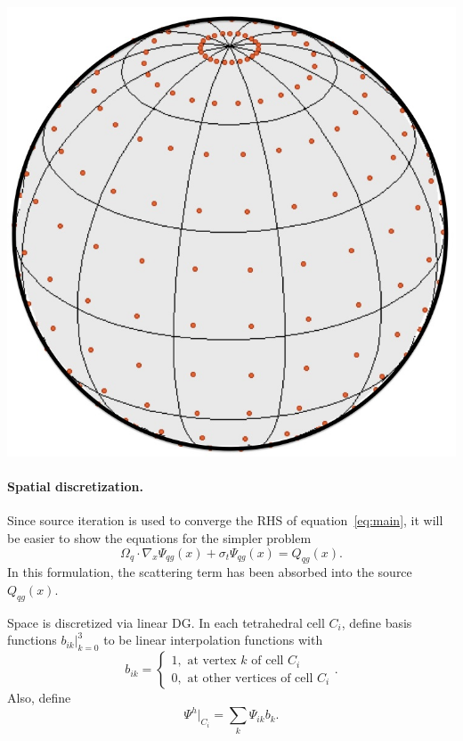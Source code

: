 \documentclass[12pt,letterpaper]{article}
\begin{document}
\includegraphics[scale=0.5]{chebyshev-legendre.jpg}


\paragraph{Spatial discretization.}
Since source iteration is used to converge the RHS of equation~\eqref{eq:main}, it will be easier to show the equations for the simpler problem
\begin{equation}
\Omega_q \cdot \nabla_x \Psi_{qg}(x) + \sigma_t \Psi_{qg}(x) = Q_{qg}(x).
\end{equation}
In this formulation, the scattering term has been absorbed into the source $Q_{qg}(x)$.

Space is discretized via linear DG.
In each tetrahedral cell $C_i$, define basis functions $b_{ik}|_{k=0}^3$ to be linear interpolation functions with 
\begin{equation}
b_{ik} = \begin{cases}
1, \textrm{ at vertex } k \textrm{ of cell } C_i \\
0, \textrm{ at other vertices of cell } C_i
\end{cases}.
\end{equation}
Also, define 
\begin{equation}
\Psi^h|_{C_i} = \sum_k \Psi_{ik} b_k.
\end{equation}
\end{document}
